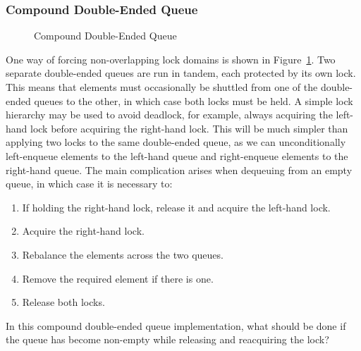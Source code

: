 \subsubsection{Compound Double-Ended Queue}
\label{sec:SMPdesign:Compound Double-Ended Queue}

\begin{figure}[tb]
\begin{center}
\end{center}
\caption{Compound Double-Ended Queue}
\label{fig:SMPdesign:Compound Double-Ended Queue}
\end{figure}

One way of forcing non-overlapping lock domains is shown in
Figure~\ref{fig:SMPdesign:Compound Double-Ended Queue}.
Two separate double-ended queues are run in tandem, each protected by
its own lock.
This means that elements must occasionally be shuttled from one of
the double-ended queues to the other, in which case both locks must
be held.
A simple lock hierarchy may be used to avoid deadlock, for example,
always acquiring the left-hand lock before acquiring the right-hand lock.
This will be much simpler than applying two locks to the same
double-ended queue, as we can unconditionally left-enqueue elements
to the left-hand queue and right-enqueue elements to the right-hand
queue.
The main complication arises when dequeuing from an empty queue, in
which case it is necessary to:

\begin{enumerate}
\item	If holding the right-hand lock, release it and acquire the
	left-hand lock.
\item	Acquire the right-hand lock.
\item	Rebalance the elements across the two queues.
\item	Remove the required element if there is one.
\item	Release both locks.
\end{enumerate}

\QuickQuiz{}
	In this compound double-ended queue implementation, what should
	be done if the queue has become non-empty while releasing
	and reacquiring the lock?
 \QuickQuizEnd

